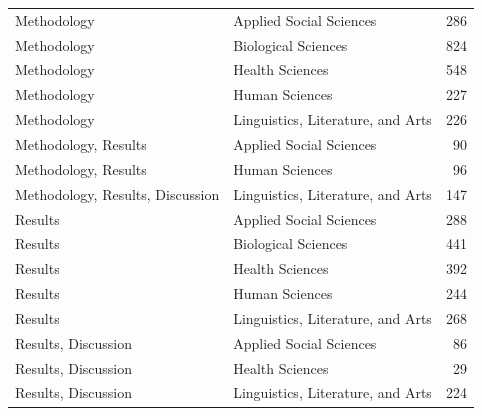 \begin{longtable}{llr}
Methodology & Applied Social Sciences & 286 \\
Methodology & Biological Sciences & 824 \\
Methodology & Health Sciences & 548 \\
Methodology & Human Sciences & 227 \\
Methodology & Linguistics, Literature, and Arts & 226 \\
Methodology, Results & Applied Social Sciences & 90 \\
Methodology, Results & Human Sciences & 96 \\
Methodology, Results, Discussion & Linguistics, Literature, and Arts & 147 \\
Results & Applied Social Sciences & 288 \\
Results & Biological Sciences & 441 \\
Results & Health Sciences & 392 \\
Results & Human Sciences & 244 \\
Results & Linguistics, Literature, and Arts & 268 \\
Results, Discussion & Applied Social Sciences & 86 \\
Results, Discussion & Health Sciences & 29 \\
Results, Discussion & Linguistics, Literature, and Arts & 224 \\
\end{longtable}
